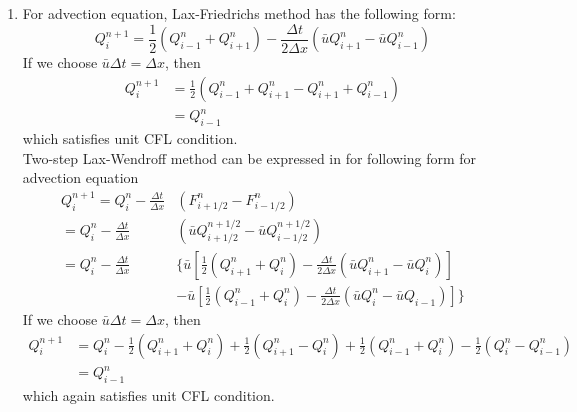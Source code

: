 \documentclass[11pt]{article}
\begin{document}
\begin{enumerate}
\begin{enumerate}
				\item
					For advection equation, Lax-Friedrichs method has the following form:
					\[
					Q_i^{n+1}=\frac{1}{2}(Q_{i-1}^n+Q_{i+1}^n)
					-\frac{\Delta t}{2\Delta x}(\bar{u}Q_{i+1}^n-\bar{u}Q_{i-1}^n)
					\]				
					If we choose $\bar{u}\Delta t=\Delta x$, then
					\begin{align*}
					Q_i^{n+1}&=\frac{1}{2}(Q_{i-1}^n+Q_{i+1}^n-Q_{i+1}^n+Q_{i-1}^n)\\
					&=Q_{i-1}^n
					\end{align*}
					which satisfies unit CFL condition.\\
					
					Two-step Lax-Wendroff method can be expressed in for following form for advection equation
					\begin{align*}
					Q_i^{n+1}= Q_i^n-\frac{\Delta t}{\Delta x}&(F_{i+1/2}^n-F_{i-1/2}^n)\\
					=Q_i^n-\frac{\Delta t}{\Delta x}
					&(\bar{u}Q_{i+1/2}^{n+1/2}-\bar{u}Q_{i-1/2}^{n+1/2}) \\
					=Q_i^n-\frac{\Delta t}{\Delta x}&\{\bar{u}[ \frac{1}{2}(Q_{i+1}^n+Q_i^n)-\frac{\Delta t}{2\Delta x}(\bar{u}Q_{i+1}^n-\bar{u}Q_i^n)]\\
					&-\bar{u}[\frac{1}{2}(Q_{i-1}^n+Q_i^n)-\frac{\Delta t}{2\Delta x}(\bar{u}Q_i^n-\bar{u}Q_{i-1})]\}
					\end{align*}
					If we choose $\bar{u}\Delta t=\Delta x$, then
					\begin{align*}
					Q_i^{n+1}&=Q_i^n-\frac{1}{2}(Q_{i+1}^n+Q_i^n)+\frac{1}{2}(Q_{i+1}^n-Q_i^n)+\frac{1}{2}(Q_{i-1}^n+Q_i^n)-\frac{1}{2}(Q_i^n-Q_{i-1}^n)\\
					&=Q_{i-1}^n
					\end{align*}
					which again satisfies unit CFL condition.
					

\end{enumerate}
\end{enumerate}
\end{document}
